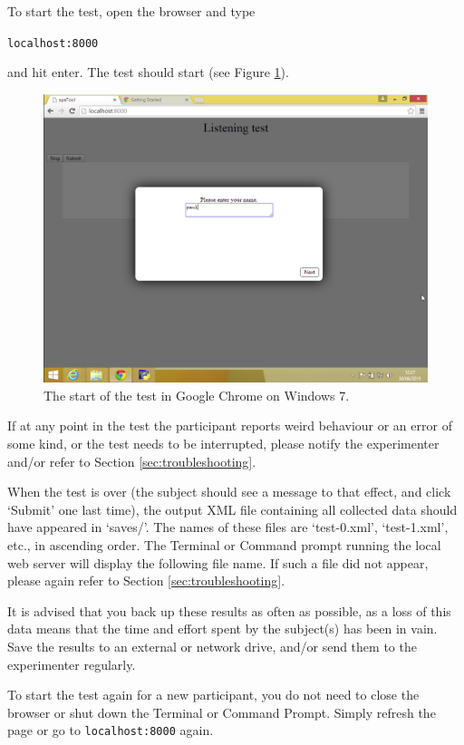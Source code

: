 \documentclass[11pt, oneside]{article}   	%
\begin{document}
		    To start the test, open the browser and type 
				
			\texttt{localhost:8000}
		
			and hit enter. The test should start (see Figure \ref{fig:test}). 
		
			\begin{figure}[htb]
	        \begin{center}
	        \includegraphics[width=.8\textwidth]{test.png}
	        \caption{The start of the test in Google Chrome on Windows 7.}
	        \label{fig:test}
	        \end{center}
	        \end{figure}
                    
        If at any point in the test the participant reports weird behaviour or an error of some kind, or the test needs to be interrupted, please notify the experimenter and/or refer to Section \ref{sec:troubleshooting}. 
		
		When the test is over (the subject should see a message to that effect, and click `Submit' one last time), the output XML file containing all collected data should have appeared in `saves/'. The names of these files are `test-0.xml', `test-1.xml', etc., in ascending order. The Terminal or Command prompt running the local web server will display the following file name. If such a file did not appear, please again refer to Section \ref{sec:troubleshooting}. 
		
		It is advised that you back up these results as often as possible, as a loss of this data means that the time and effort spent by the subject(s) has been in vain. Save the results to an external or network drive, and/or send them to the experimenter regularly. 
		
		To start the test again for a new participant, you do not need to close the browser or shut down the Terminal or Command Prompt. Simply refresh the page or go to \texttt{localhost:8000} again. 
		
\end{document}
